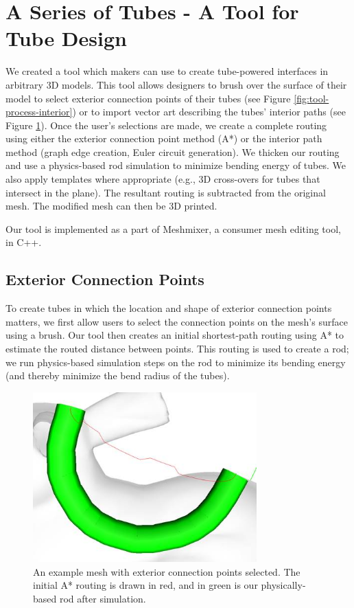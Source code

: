 \section{A Series of Tubes - A Tool for Tube Design}

We created a tool which makers can use to create tube-powered interfaces in arbitrary 3D models.  This tool allows designers to brush over the surface of their model to select exterior connection points of their tubes (see Figure \ref{fig:tool-process-interior}) or to import vector art describing the tubes' interior paths (see Figure \ref{fig:tool-process-exterior}).  Once the user's selections are made, we create a complete routing using either the exterior connection point method (A*) or the interior path method (graph edge creation, Euler circuit generation).  We thicken our routing and use a physics-based rod simulation to minimize bending energy of tubes.  We also apply templates where appropriate (e.g., 3D cross-overs for tubes that intersect in the plane).  The resultant routing is subtracted from the original mesh.  The modified mesh can then be 3D printed.

Our tool is implemented as a part of Meshmixer, a consumer mesh editing tool, in C++.

\subsection{Exterior Connection Points}

To create tubes in which the location and shape of exterior connection points matters, we first allow users to select the connection points on the mesh's surface using a brush. Our tool then creates an initial shortest-path routing using A* to estimate the routed distance between points.  This routing is used to create a rod; we run physics-based simulation steps on the rod to minimize its bending energy (and thereby minimize the bend radius of the tubes).

\begin{figure}[h!]
\centering
    \includegraphics[width=3.4in]{figures/placeholder/exterior.jpg}
\caption{An example mesh with exterior connection points selected.  The initial A* routing is drawn in {\color{red}red}, and in {\color{tovi}green} is our physically-based rod after simulation.}
\label{fig:tool-process-exterior}
\end{figure}

